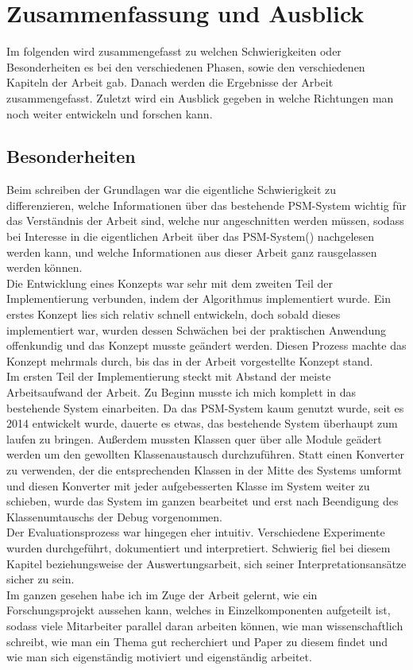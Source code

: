 \chapter{Zusammenfassung und Ausblick}\label{ch:zusammenfassung}
Im folgenden wird zusammengefasst zu welchen Schwierigkeiten oder Besonderheiten es bei den verschiedenen Phasen, sowie den verschiedenen Kapiteln der Arbeit gab. Danach werden die Ergebnisse der Arbeit zusammengefasst. Zuletzt wird ein Ausblick gegeben in welche Richtungen man noch weiter entwickeln und forschen kann.
\section{Besonderheiten}
Beim schreiben der Grundlagen war die eigentliche Schwierigkeit zu differenzieren, welche Informationen über das bestehende PSM-System wichtig für das Verständnis der Arbeit sind, welche nur angeschnitten werden müssen, sodass bei Interesse in die eigentlichen Arbeit über das PSM-System(\cite{gehrung14})  nachgelesen werden kann, und welche Informationen aus dieser Arbeit ganz rausgelassen werden können.\smallskip\\
Die Entwicklung eines Konzepts war sehr mit dem zweiten Teil der Implementierung verbunden, indem der Algorithmus implementiert wurde. Ein erstes Konzept lies sich relativ schnell entwickeln, doch sobald dieses implementiert war, wurden dessen Schwächen bei der praktischen Anwendung offenkundig und das Konzept musste geändert werden. Diesen Prozess machte das Konzept mehrmals durch, bis das in der Arbeit vorgestellte Konzept stand.\smallskip\\
Im ersten Teil der Implementierung steckt mit Abstand der meiste Arbeitsaufwand der Arbeit. Zu Beginn musste ich mich komplett in das bestehende System einarbeiten. Da das PSM-System kaum genutzt wurde, seit es 2014 entwickelt wurde, dauerte es etwas, das bestehende System überhaupt zum laufen zu bringen. Außerdem mussten Klassen quer über alle Module geädert werden um den gewollten Klassenaustausch durchzuführen. Statt einen Konverter zu verwenden, der die entsprechenden Klassen in der Mitte des Systems umformt und diesen Konverter mit jeder aufgebesserten Klasse im System weiter zu schieben, wurde das System im ganzen bearbeitet und erst nach Beendigung des Klassenumtauschs der Debug vorgenommen.\smallskip\\
Der Evaluationsprozess war hingegen eher intuitiv. Verschiedene Experimente wurden durchgeführt, dokumentiert und interpretiert. Schwierig fiel bei diesem Kapitel beziehungsweise der Auswertungsarbeit, sich seiner Interpretationsansätze sicher zu sein.\smallskip\\
Im ganzen gesehen habe ich im Zuge der Arbeit gelernt, wie ein Forschungsprojekt aussehen kann, welches in Einzelkomponenten aufgeteilt ist, sodass viele Mitarbeiter parallel daran arbeiten können, wie man wissenschaftlich schreibt, wie man ein Thema gut recherchiert und Paper zu diesem findet und wie man sich eigenständig motiviert und eigenständig arbeitet.\smallskip\\
